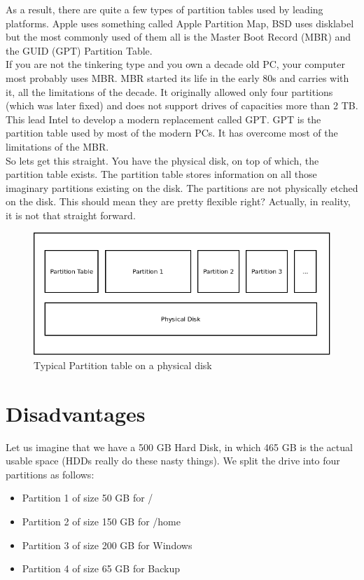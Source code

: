 As a result, there are quite a few types of partition tables used by leading
platforms. Apple uses something called Apple Partition Map, BSD uses disklabel
but the most commonly used of them all is the Master Boot Record (MBR) and the
GUID (GPT) Partition Table.\\

If you are not the tinkering type and you own a decade old PC, your computer
most probably uses MBR. MBR started its life in the early 80s and carries with
it, all the limitations of the decade. It originally allowed only four
partitions (which was later fixed) and does not support drives of capacities
more than 2 TB. This lead Intel to develop a modern replacement called GPT. GPT
is the partition table used by most of the modern PCs. It has overcome most of
the limitations of the MBR.\\

So lets get this straight. You have the physical disk, on top of which, the
partition table exists. The partition table stores information on all those
imaginary partitions existing on the disk. The partitions are not physically
etched on the disk. This should mean they are pretty flexible right? Actually,
in reality, it is not that straight forward.

\begin{figure}
	\centering
	\includegraphics[scale=0.5]{partitions.png}
	\caption{Typical Partition table on a physical disk}
\end{figure}

\section{Disadvantages}
Let us imagine that we have a 500 GB Hard Disk, in which 465 GB is the actual
usable space (HDDs really do these nasty things). We split the drive into four
partitions as follows:

\begin{itemize}
    \item Partition 1 of size 50 GB for /
    \item Partition 2 of size 150 GB for /home
    \item Partition 3 of size 200 GB for Windows
    \item Partition 4 of size 65 GB for Backup
\end{itemize}

